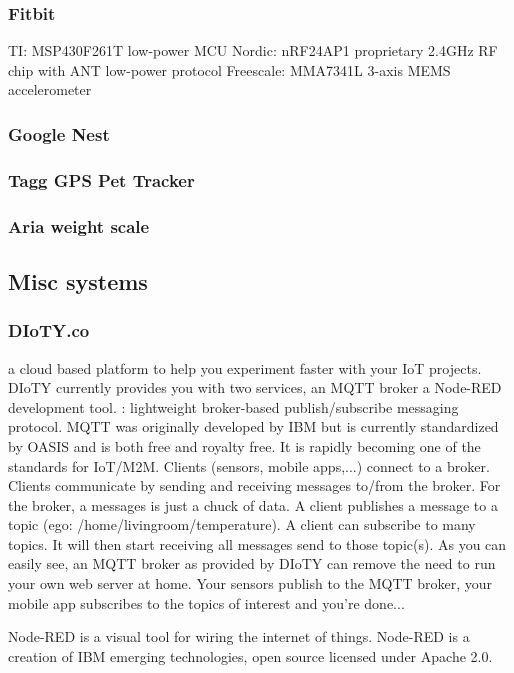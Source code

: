 \documentclass{myproc}
\begin{document}
\subsubsection{Fitbit}
\bit
\w TI: MSP430F261T low-power MCU
\w Nordic: nRF24AP1 proprietary 2.4GHz RF chip with ANT low-power protocol
\w Freescale: MMA7341L 3-axis MEMS accelerometer
\eit
\subsubsection{Google Nest}
\subsubsection{Tagg GPS Pet Tracker}
\subsubsection{Aria weight scale}

\subsection{Misc systems}
\subsubsection{DIoTY.co}
\bit 
\w a cloud based platform to help you experiment faster with your IoT
projects.  
\w 
DIoTY currently provides you with two services, 
  \bit
  \w an MQTT broker 
  \w a Node-RED development tool.
  \eit
\w {}: lightweight broker-based
publish/subscribe messaging protocol.  MQTT was originally developed by IBM
but is currently standardized by OASIS and is both free and royalty free.  It
is rapidly becoming one of the standards for IoT/M2M.   
  \bit
  \w Clients (sensors, mobile apps,...) connect to a broker.
   \w Clients communicate by sending and receiving messages to/from the
broker.  
   For the broker, a messages is just a chuck of data.
  \w A client publishes a message to a topic (ego: /home/livingroom/temperature).
  \w A client can subscribe to many topics.  It will then start receiving all
messages send to those topic(s).
  \eit
\w As you can easily see, an MQTT broker as provided by DIoTY can remove the need to run your own web server at home.  Your sensors publish to the MQTT broker, your mobile app subscribes to the topics of interest and you're done... 

\w Node-RED is a visual tool for wiring the internet of things.  Node-RED is a creation of IBM emerging technologies, open source licensed under Apache 2.0.
\end{document}

